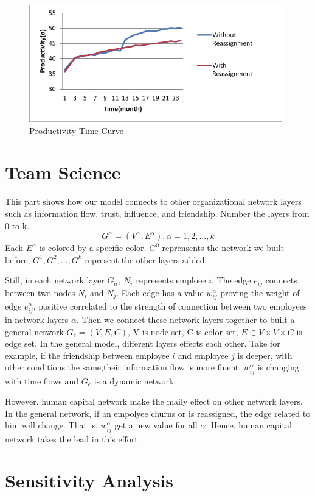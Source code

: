 \documentclass[12pt,a4paper,titlepage]{article}
\begin{document}
\begin{figure}[htb]
  \centering
  \includegraphics[width=11cm]{p3.pdf}
  \caption{Productivity-Time Curve}\label{reassign}
\end{figure}

\section{Team Science}
\label{sec:team-science}

This part shows how our model connects to other organizational network
layers such as information flow, trust, influence, and
friendship. Number the layers from 0 to
k. $$G^\alpha=(V^\alpha,E^\alpha), \alpha=1,2,\ldots,k$$ Each
$E^\alpha$ is colored by a specific color. $G^0$ reprensents the
network we built before, $G^1, G^2, \ldots ,G^k$ represent the other layers added.

Still, in each network layer $G_\alpha$, $N_i$ represents emploee
$i$. The edge $e_{ij}$ connects between two nodes $N_i$ and
$N_j$. Each edge has a value $w_{ij}^\alpha$ proving the weight of
edge $e_{ij}^\alpha$, positive correlated to the strength of
connection between two employees in network layers $\alpha$. Then we
connect these network layers together to built a general network
$G_e=(V, E, C)$, V is node set, C is color set, $E \subset  V\times
V\times C$ is edge set. In the general model, different layers effects
each other. Take for example, if the friendship between employee $i$
and employee $j$ is deeper, with other conditions the same,their
information flow is more fluent. $w_{ij}^\alpha$ is changing with time
flows and $G_e$ is a dynamic network.

However, human capital network make the maily effect on other network
layers. In the general network, if an empolyee churns or is
reassigned, the edge related to him will change. That is,
$w_{ij}^\alpha$ get a new value for all $\alpha$. Hence, human capital
network takes the lead in this effort.

\section{Sensitivity Analysis}
\label{sec:sensitivity-analysis}
\end{document}
